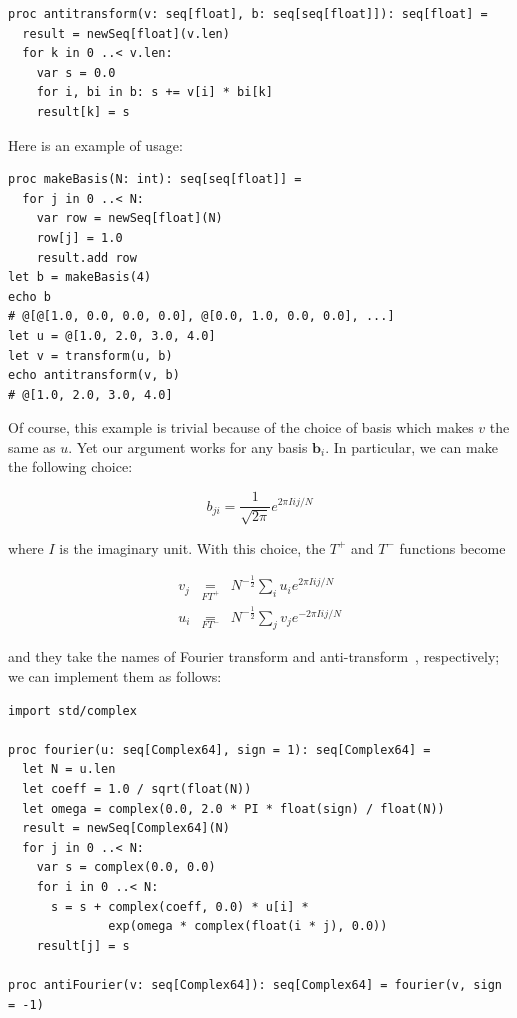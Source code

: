 \documentclass[justified, sixbynine]{tufte-book}
\def\stackunder#1#2{\mathrel{\mathop{#2}\limits_{#1}}}
\theoremstyle{plain}%
\newtheorem * {corollary}{Corollary}
\theoremstyle{definition}
\theoremstyle{remark}
\newtheorem * {remark}{Remark}
\newtheorem * {note}{Note}
\begin{document}
\begin{fullwidth}
\begin{lstlisting}
proc antitransform(v: seq[float], b: seq[seq[float]]): seq[float] =
  result = newSeq[float](v.len)
  for k in 0 ..< v.len:
    var s = 0.0
    for i, bi in b: s += v[i] * bi[k]
    result[k] = s
\end{lstlisting}

Here is an example of usage:

\begin{lstlisting}
proc makeBasis(N: int): seq[seq[float]] =
  for j in 0 ..< N:
    var row = newSeq[float](N)
    row[j] = 1.0
    result.add row
let b = makeBasis(4)
echo b
# @[@[1.0, 0.0, 0.0, 0.0], @[0.0, 1.0, 0.0, 0.0], ...]
let u = @[1.0, 2.0, 3.0, 4.0]
let v = transform(u, b)
echo antitransform(v, b)
# @[1.0, 2.0, 3.0, 4.0]
\end{lstlisting}

Of course, this example is trivial because of the choice of basis which makes $v$ the same as $u$. Yet our argument works for any basis $\mathbf{b}_i$. In particular, we can make the following choice:


\begin{equation}
b_{ji} = \frac{1}{\sqrt{2\pi}} e^{2\pi I ij/N}
\end{equation}

where $I$ is the imaginary unit. With this choice, the $T^+$ and $T^-$ functions become

\begin{eqnarray}
v_j &\stackunder{FT^+}{=}& N^{-\frac12} \sum_i u_i e^{2\pi I ij/N} \\
\label{fourierd1}
u_i &\stackunder{FT^-}{=}& N^{-\frac12} \sum_j v_j e^{-2\pi I ij/N}
\label{fourierd2}
\end{eqnarray}

and they take the names of Fourier transform and anti-transform~\cite{fourier}, respectively;
we can implement them as follows:

\begin{lstlisting}
import std/complex

proc fourier(u: seq[Complex64], sign = 1): seq[Complex64] =
  let N = u.len
  let coeff = 1.0 / sqrt(float(N))
  let omega = complex(0.0, 2.0 * PI * float(sign) / float(N))
  result = newSeq[Complex64](N)
  for j in 0 ..< N:
    var s = complex(0.0, 0.0)
    for i in 0 ..< N:
      s = s + complex(coeff, 0.0) * u[i] *
              exp(omega * complex(float(i * j), 0.0))
    result[j] = s

proc antiFourier(v: seq[Complex64]): seq[Complex64] = fourier(v, sign = -1)
\end{lstlisting}


\end{fullwidth}
\end{document}
